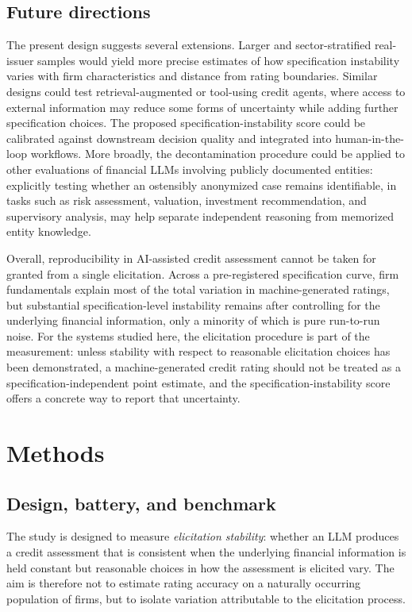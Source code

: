 \documentclass[a4paper,fleqn]{cas-sc}
\begin{document}
\subsection{Future directions}
The present design suggests several extensions. Larger and sector-stratified real-issuer samples would
yield more precise estimates of how specification instability varies with firm characteristics and
distance from rating boundaries. Similar designs could test retrieval-augmented or tool-using credit
agents, where access to external information may reduce some forms of uncertainty while adding further
specification choices. The proposed specification-instability score could be calibrated against downstream
decision quality and integrated into human-in-the-loop workflows. More broadly, the decontamination
procedure could be applied to other evaluations of financial LLMs involving publicly documented entities:
explicitly testing whether an ostensibly anonymized case remains identifiable, in tasks such as risk
assessment, valuation, investment recommendation, and supervisory analysis, may help separate independent
reasoning from memorized entity knowledge.

Overall, reproducibility in AI-assisted credit assessment cannot be taken for granted from a single
elicitation. Across a pre-registered specification curve, firm fundamentals explain most of the total
variation in machine-generated ratings, but substantial specification-level instability remains after
controlling for the underlying financial information, only a minority of which is pure run-to-run noise.
For the systems studied here, the elicitation procedure is part of the measurement: unless stability with
respect to reasonable elicitation choices has been demonstrated, a machine-generated credit rating should
not be treated as a specification-independent point estimate, and the specification-instability score offers
a concrete way to report that uncertainty.

\section{Methods}
\subsection{Design, battery, and benchmark}
The study is designed to measure \emph{elicitation stability}: whether an LLM produces a credit
assessment that is consistent when the underlying financial information is held constant but reasonable
choices in how the assessment is elicited vary. The aim is therefore not to estimate rating accuracy on a
naturally occurring population of firms, but to isolate variation attributable to the elicitation
process.
\end{document}

